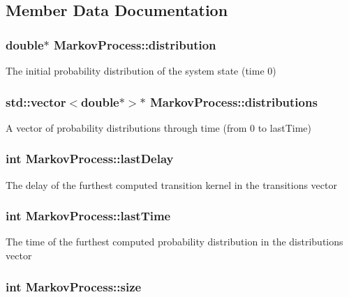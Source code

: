 \subsection{Member Data Documentation}
\hypertarget{classMarkovProcess_ab08fd1641b1f866be6a7e3dcca7ed575}{
\subsubsection[{distribution}]{\setlength{\rightskip}{0pt plus 5cm}double$\ast$ Markov\-Process\-::distribution}}\label{classMarkovProcess_ab08fd1641b1f866be6a7e3dcca7ed575}
The initial probability distribution of the system state (time 0) \hypertarget{classMarkovProcess_a8e5ced320dd6b0a41c2f38f316c37cbf}{
\subsubsection[{distributions}]{\setlength{\rightskip}{0pt plus 5cm}std\-::vector$<$double$\ast$$>$$\ast$ Markov\-Process\-::distributions}}\label{classMarkovProcess_a8e5ced320dd6b0a41c2f38f316c37cbf}
A vector of probability distributions through time (from 0 to last\-Time) \hypertarget{classMarkovProcess_a5fa10a819200afd87b558332b6e351a6}{
\subsubsection[{last\-Delay}]{\setlength{\rightskip}{0pt plus 5cm}int Markov\-Process\-::last\-Delay}}\label{classMarkovProcess_a5fa10a819200afd87b558332b6e351a6}
The delay of the furthest computed transition kernel in the transitions vector \hypertarget{classMarkovProcess_a5eddf681cb7bc196a248813ba42b516f}{
\subsubsection[{last\-Time}]{\setlength{\rightskip}{0pt plus 5cm}int Markov\-Process\-::last\-Time}}\label{classMarkovProcess_a5eddf681cb7bc196a248813ba42b516f}
The time of the furthest computed probability distribution in the distributions vector \hypertarget{classMarkovProcess_ad38170c3a73d113dc152e73bc57d0523}{
\subsubsection[{size}]{\setlength{\rightskip}{0pt plus 5cm}int Markov\-Process\-::size}}\label{classMarkovProcess_ad38170c3a73d113dc152e73bc57d0523}
